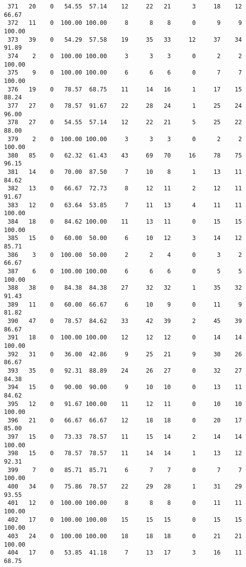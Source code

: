 \begin{verbatim}
 371   20    0   54.55  57.14    12     22   21      3     18    12    66.67
 372   11    0  100.00 100.00     8      8    8      0      9     9   100.00
 373   39    0   54.29  57.58    19     35   33     12     37    34    91.89
 374    2    0  100.00 100.00     3      3    3      0      2     2   100.00
 375    9    0  100.00 100.00     6      6    6      0      7     7   100.00
 376   19    0   78.57  68.75    11     14   16      1     17    15    88.24
 377   27    0   78.57  91.67    22     28   24      1     25    24    96.00
 378   27    0   54.55  57.14    12     22   21      5     25    22    88.00
 379    2    0  100.00 100.00     3      3    3      0      2     2   100.00
 380   85    0   62.32  61.43    43     69   70     16     78    75    96.15
 381   14    0   70.00  87.50     7     10    8      1     13    11    84.62
 382   13    0   66.67  72.73     8     12   11      2     12    11    91.67
 383   12    0   63.64  53.85     7     11   13      4     11    11   100.00
 384   18    0   84.62 100.00    11     13   11      0     15    15   100.00
 385   15    0   60.00  50.00     6     10   12      3     14    12    85.71
 386    3    0  100.00  50.00     2      2    4      0      3     2    66.67
 387    6    0  100.00 100.00     6      6    6      0      5     5   100.00
 388   38    0   84.38  84.38    27     32   32      1     35    32    91.43
 389   11    0   60.00  66.67     6     10    9      0     11     9    81.82
 390   47    0   78.57  84.62    33     42   39      2     45    39    86.67
 391   18    0  100.00 100.00    12     12   12      0     14    14   100.00
 392   31    0   36.00  42.86     9     25   21      9     30    26    86.67
 393   35    0   92.31  88.89    24     26   27      0     32    27    84.38
 394   15    0   90.00  90.00     9     10   10      0     13    11    84.62
 395   12    0   91.67 100.00    11     12   11      0     10    10   100.00
 396   21    0   66.67  66.67    12     18   18      0     20    17    85.00
 397   15    0   73.33  78.57    11     15   14      2     14    14   100.00
 398   15    0   78.57  78.57    11     14   14      1     13    12    92.31
 399    7    0   85.71  85.71     6      7    7      0      7     7   100.00
 400   34    0   75.86  78.57    22     29   28      1     31    29    93.55
 401   12    0  100.00 100.00     8      8    8      0     11    11   100.00
 402   17    0  100.00 100.00    15     15   15      0     15    15   100.00
 403   24    0  100.00 100.00    18     18   18      0     21    21   100.00
 404   17    0   53.85  41.18     7     13   17      3     16    11    68.75

\end{verbatim}
